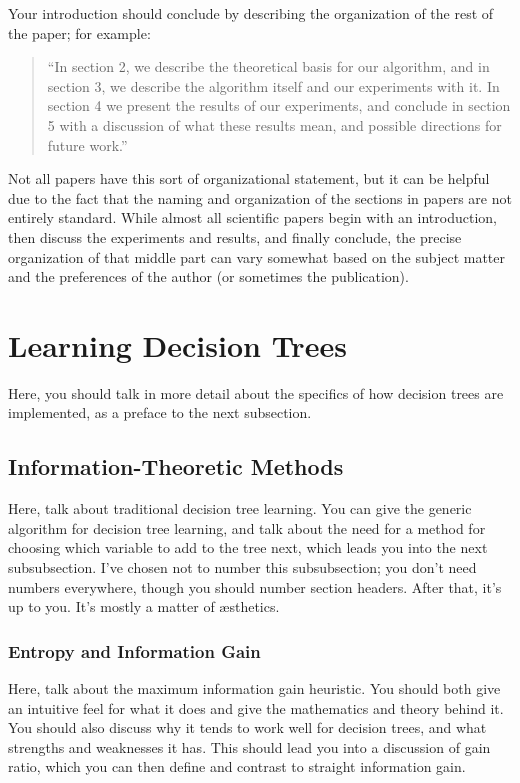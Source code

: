 \documentclass[12pt, letterpaper]{article}
\begin{document}
Your introduction should conclude by describing the organization of the rest of
the paper; for example:
\begin{quote}
``In section 2, we describe the theoretical basis for our algorithm, and in section
3, we describe the algorithm itself and our experiments with it.  In section 4
we present the results of our experiments, and conclude in section 5 with a
discussion of what these results mean, and possible directions for future
work.''
\end{quote}

Not all papers have this sort of organizational statement, but it can be helpful
due to the fact that the naming and organization of the sections in papers are
not entirely standard.  While almost all scientific papers begin with an
introduction, then discuss the experiments and results, and finally conclude,
the precise organization of that middle part can vary somewhat based on the
subject matter and the preferences of the author (or sometimes the publication).

\section{Learning Decision Trees}
Here, you should talk in more detail about the specifics of how decision trees
are implemented, as a preface to the next subsection.

\subsection{Information-Theoretic Methods}
Here, talk about traditional decision tree learning.  You can give the generic
algorithm for decision tree learning, and talk about the need for a method for
choosing which variable to add to the tree next, which leads you into the next
subsubsection.  I've chosen not to number this subsubsection; you don't need
numbers everywhere, though you should number section headers.  After that, it's
up to you.  It's mostly a matter of \ae sthetics.

\subsubsection*{Entropy and Information Gain}
Here, talk about the maximum information gain heuristic.  You should both give
an intuitive feel for what it does and give the mathematics and theory behind
it.  You should also discuss why it tends to work well for decision trees, and
what strengths and weaknesses it has.  This should lead you into a discussion of
gain ratio, which you can then define and contrast to straight information gain.
\end{document}
